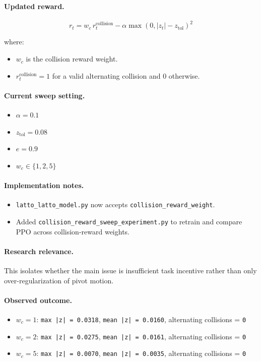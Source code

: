 \documentclass[11pt]{article}
\begin{document}
\paragraph{Updated reward.}
\[
r_t =
w_c \, r_t^{\mathrm{collision}}
- \alpha \max(0, |z_t| - z_{\mathrm{tol}})^2
\]

where:
\begin{itemize}[leftmargin=1.5em]
  \item $w_c$ is the collision reward weight.
  \item $r_t^{\mathrm{collision}} = 1$ for a valid alternating collision and $0$ otherwise.
\end{itemize}

\paragraph{Current sweep setting.}
\begin{itemize}[leftmargin=1.5em]
  \item $\alpha = 0.1$
  \item $z_{\mathrm{tol}} = 0.08$
  \item $e = 0.9$
  \item $w_c \in \{1, 2, 5\}$
\end{itemize}

\paragraph{Implementation notes.}
\begin{itemize}[leftmargin=1.5em]
  \item \texttt{latto\_latto\_model.py} now accepts \texttt{collision\_reward\_weight}.
  \item Added \texttt{collision\_reward\_sweep\_experiment.py} to retrain and compare PPO across collision-reward weights.
\end{itemize}

\paragraph{Research relevance.}
This isolates whether the main issue is insufficient task incentive rather than only over-regularization of pivot motion.

\paragraph{Observed outcome.}
\begin{itemize}[leftmargin=1.5em]
  \item $w_c = 1$: \texttt{max |z| = 0.0318}, \texttt{mean |z| = 0.0160}, alternating collisions = \texttt{0}
  \item $w_c = 2$: \texttt{max |z| = 0.0275}, \texttt{mean |z| = 0.0161}, alternating collisions = \texttt{0}
  \item $w_c = 5$: \texttt{max |z| = 0.0070}, \texttt{mean |z| = 0.0035}, alternating collisions = \texttt{0}
\end{itemize}
\end{document}
